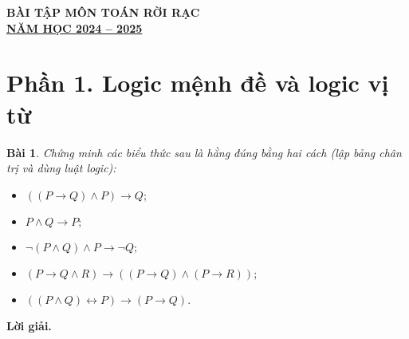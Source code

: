 \documentclass[11pt, oneside,openright,a4paper]{book}
\newtheorem{bt}{Bài }[section]
\begin{document}
\large
%
\newpage

\setcounter{page}{1}
\pagestyle{fancy}
\fancyhf{}
\rfoot{\thepage}
\renewcommand{\headrulewidth}{0.4pt}
\renewcommand{\footrulewidth}{0.4pt}
\hspace{0.5 cm}
\begin{center}
\textbf{BÀI TẬP MÔN TOÁN RỜI RẠC}\\

\textbf{\underline{NĂM HỌC 2024 -- 2025}}\\
\end{center}

\section[Phần 1. Logic mệnh đề và logic vị từ]{ Phần 1. Logic mệnh đề và logic vị từ}
\begin{bt}
Chứng minh các biểu thức sau là hằng đúng bằng hai cách (lập bảng chân trị và dùng luật logic): 
 \begin{itemize}
 \item[a)] $((P \rightarrow Q) \land P) \rightarrow Q;$ 
\item[b)] $P \land Q \rightarrow P;$ 
 \item[c)] $\lnot (P \land Q) \land P \rightarrow \lnot Q;$
 \item[d)] $(P \rightarrow Q \land R) \rightarrow ((P \rightarrow Q) \land (P \rightarrow R));$ 
\item[d)] $((P \land Q) \leftrightarrow P) \rightarrow (P \rightarrow Q).$
 \end{itemize}
\end{bt}
{\bf Lời giải.} 
\end{document}
